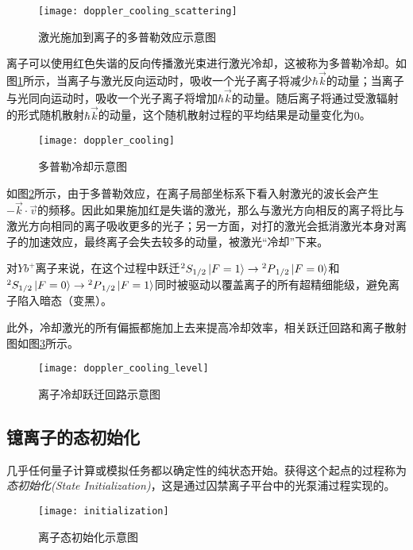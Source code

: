 \begin{figure}
    \centering
    \caption[激光施加到离子的多普勒效应示意图]{激光施加到离子的多普勒效应示意图\label{fig:doppler_cooling_scattering}}
    \texttt{[image: doppler\_cooling\_scattering]}
\end{figure}
离子可以使用红色失谐的反向传播激光束进行激光冷却，这被称为多普勒冷却\cite[]{Hänsch_Schawlow_1975}。如图\ref{fig:doppler_cooling_scattering}所示，当离子与激光反向运动时，吸收一个光子离子将减少$\hbar \vec{k}$的动量；当离子与光同向运动时，吸收一个光子离子将增加$\hbar \vec{k}$的动量。随后离子将通过受激辐射的形式随机散射$\hbar \vec{k}$的动量，这个随机散射过程的平均结果是动量变化为$0$。

\begin{figure}
    \centering
    \caption[多普勒冷却示意图]{多普勒冷却示意图\label{fig:doppler_cooling}}
    \texttt{[image: doppler\_cooling]}
\end{figure}
如图\ref{fig:doppler_cooling}所示，由于多普勒效应，在离子局部坐标系下看入射激光的波长会产生$-\vec{k}\cdot\vec{v}$的频移。因此如果施加红是失谐的激光，那么与激光方向相反的离子将比与激光方向相同的离子吸收更多的光子；另一方面，对打的激光会抵消激光本身对离子的加速效应，最终离子会失去较多的动量，被激光“冷却”下来。

对$Yb^+$离子来说，在这个过程中跃迁$^2S_{1/2}\ket{F=1}\to {^2P}_{1/2}\ket{F=0}$和$^2S_{1/2}\ket{F=0}\to {^2P}_{1/2}\ket{F=1}$同时被驱动以覆盖离子的所有超精细能级，避免离子陷入暗态（变黑）。

此外，冷却激光的所有偏振都施加上去来提高冷却效率，相关跃迁回路和离子散射图如图\ref{fig:doppler_cooling_level}所示。
\begin{figure}
    \centering
    \caption[离子冷却跃迁回路示意图]{离子冷却跃迁回路示意图\label{fig:doppler_cooling_level}}
    \texttt{[image: doppler\_cooling\_level]}
\end{figure}

\subsection[镱离子的态初始化]{镱离子的态初始化\label{section:yb_state_init}}

几乎任何量子计算或模拟任务都以确定性的纯状态开始。获得这个起点的过程称为\emph{态初始化(State Initialization)}，这是通过囚禁离子平台中的光泵浦过程实现的。

\begin{figure}
    \centering
    \caption[离子态初始化示意图]{离子态初始化示意图\label{fig:initialization}}
    \texttt{[image: initialization]}
\end{figure}

